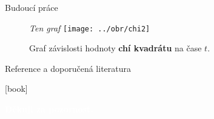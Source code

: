 \documentclass[xcolor=dvipsnames]{beamer}
\begin{document}
\begin{frame}[c]{\secname}{Budoucí práce}
	\begin{figure}
		\centering
		\large \textit{Ten  graf}
		\texttt{[image: ../obr/chi2]}
		\caption{Graf závislosti hodnoty \textbf{chí kvadrátu} na čase $t$.}
	\end{figure}
\end{frame}

\begin{frame}[t]{\secname}{Reference a doporučená literatura}
	\printbibliography

	{\color{blue}\hdashrule[0.5ex]{\textwidth}{0.7pt}{2mm}}

	\newrefsection{}
	[book]
	\nocite{fmt}
	\nocite{murray00}
	\nocite{brozphd}
	\printbibliography
\end{frame}

{
%
\begin{frame}
	\textcolor{white}{\textbf{Děkuji za pozornost.}}
\end{frame}
}
\end{document}
